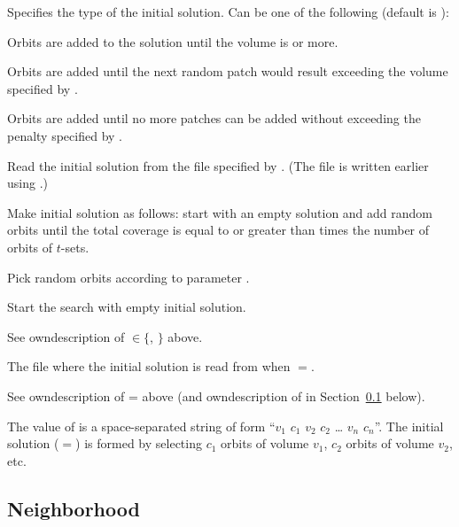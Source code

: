 \documentclass[12pt,a4paper]{article}
\begin{document}
\begin{owndescription}
\item[\Var{initsol}] Specifies the type of the initial solution. Can
  be one of the following (default is ):
  \begin{owndescription}
  \item[\Val{atleastvol}] Orbits are added to the solution until the
    volume is  or more.
  \item[\Val{atmostvol}] Orbits are added until the next random patch
    would result exceeding the volume specified by .
  \item[\Val{atmostpen}] Orbits are added until no more patches can
    be added without exceeding the penalty specified by .
  \item[\Val{read}] Read the initial solution from the file specified
    by . (The file is written earlier using
    .)
  \item[\Val{coverage}] Make initial solution as follows: start with
    an empty solution and add random orbits until the total coverage
    is equal to or greater than  times the number of
    orbits of $t$-sets.
  \item[\Val{volumes}] Pick random orbits according to parameter
    .
  \item[\Val{empty}] Start the search with empty initial solution.
  \end{owndescription}
\item[\Var{vol}] See owndescription of
  $\in\{$, $\}$ above.
\item[\Var{infile}] The file where the initial solution is read from
  when $=$.
\item[\Var{partsize}] See owndescription of =
  above (and owndescription of  in
  Section~\ref{sec:neighborhood} below).
\item[\Var{volcounts}] The value of  is a
  space-separated string of form ``$v_1$ $c_1$ $v_2$ $c_2$ \ldots
  $v_n$ $c_n$''. The initial solution ($=$)
  is formed by selecting $c_1$ orbits of volume $v_1$, $c_2$ orbits of
  volume $v_2$, etc.
\end{owndescription}

\subsection{Neighborhood}
\label{sec:neighborhood}
\end{document}
